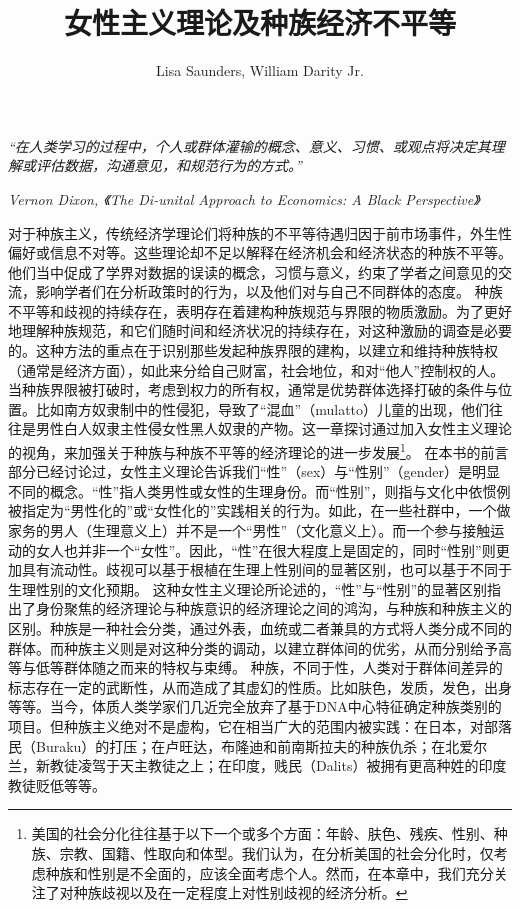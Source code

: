 \documentclass[UTF8]{ctexart}
\title{女性主义理论及种族经济不平等}
\author{Lisa Saunders, William Darity Jr.}
\begin{document}
\maketitle


\textit{“在人类学习的过程中，个人或群体灌输的概念、意义、习惯、或观点将决定其理解或评估数据，沟通意见，和规范行为的方式。”}


\textit{Vernon Dixon, 《The Di-unital Approach to Economics: A Black Perspective》}




对于种族主义，传统经济学理论们将种族的不平等待遇归因于前市场事件，外生性偏好或信息不对等。这些理论却不足以解释在经济机会和经济状态的种族不平等。他们当中促成了学界对数据的误读的概念，习惯与意义，约束了学者之间意见的交流，影响学者们在分析政策时的行为，以及他们对与自己不同群体的态度。
种族不平等和歧视的持续存在，表明存在着建构种族规范与界限的物质激励。为了更好地理解种族规范，和它们随时间和经济状况的持续存在，对这种激励的调查是必要的。这种方法的重点在于识别那些发起种族界限的建构，以建立和维持种族特权（通常是经济方面），如此来分给自己财富，社会地位，和对“他人”控制权的人。当种族界限被打破时，考虑到权力的所有权，通常是优势群体选择打破的条件与位置。比如南方奴隶制中的性侵犯，导致了“混血”（mulatto）儿童的出现，他们往往是男性白人奴隶主性侵女性黑人奴隶的产物。这一章探讨通过加入女性主义理论的视角，来加强关于种族与种族不平等的经济理论的进一步发展\footnote[1]{美国的社会分化往往基于以下一个或多个方面：年龄、肤色、残疾、性别、种族、宗教、国籍、性取向和体型。我们认为，在分析美国的社会分化时，仅考虑种族和性别是不全面的，应该全面考虑个人。然而，在本章中，我们充分关注了对种族歧视以及在一定程度上对性别歧视的经济分析。}。
在本书的前言部分已经讨论过，女性主义理论告诉我们“性”（sex）与“性别”（gender）是明显不同的概念。“性”指人类男性或女性的生理身份。而“性别”，则指与文化中依惯例被指定为“男性化的”或“女性化的”实践相关的行为。如此，在一些社群中，一个做家务的男人（生理意义上）并不是一个“男性”（文化意义上）。而一个参与接触运动的女人也并非一个“女性”。因此，“性”在很大程度上是固定的，同时“性别”则更加具有流动性。歧视可以基于根植在生理上性别间的显著区别，也可以基于不同于生理性别的文化预期。
这种女性主义理论所论述的，“性”与“性别”的显著区别指出了身份聚焦的经济理论与种族意识的经济理论之间的鸿沟，与种族和种族主义的区别。种族是一种社会分类，通过外表，血统或二者兼具的方式将人类分成不同的群体。而种族主义则是对这种分类的调动，以建立群体间的优劣，从而分别给予高等与低等群体随之而来的特权与束缚。
种族，不同于性，人类对于群体间差异的标志存在一定的武断性，从而造成了其虚幻的性质。比如肤色，发质，发色，出身等等。当今，体质人类学家们几近完全放弃了基于DNA中心特征确定种族类别的项目。但种族主义绝对不是虚构，它在相当广大的范围内被实践：在日本，对部落民（Buraku）的打压；在卢旺达，布隆迪和前南斯拉夫的种族仇杀；在北爱尔兰，新教徒凌驾于天主教徒之上；在印度，贱民（Dalits）被拥有更高种姓的印度教徒贬低等等。
\end{document}

